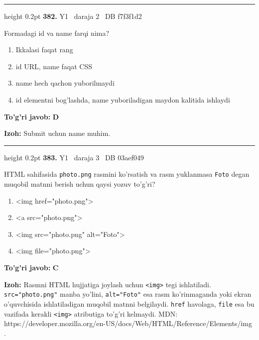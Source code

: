 \documentclass[10pt,a4paper,oneside]{article}
\begin{document}
\vspace{2mm}\hrule height 0.2pt \vspace{4mm}
\hypertarget{q382}{\textbf{\color{ink}382.}}  {\color{muted}\scriptsize Y1 \textbullet\ daraja 2 \textbullet\ DB f7f3f1d2}
\par
Formadagi id va name farqi nima?
\begin{enumerate}[label=\Alph*),leftmargin=9mm]
\item Ikkalasi faqat rang
\item id URL, name faqat CSS
\item name hech qachon yuborilmaydi
\item id elementni bog'lashda, name yuboriladigan maydon kalitida ishlaydi
\end{enumerate}
\begin{tcolorbox}[enhanced,breakable,colback=teal!4,colframe=teal!45!black,boxrule=0.45pt,arc=1.2mm,left=2.8mm,right=2.8mm,top=2mm,bottom=2mm,before skip=2mm,after skip=2mm]
\textbf{\color{teal}To'g'ri javob:} \textbf{D}
\par\smallskip
\textbf{Izoh:} Submit uchun name muhim.
\end{tcolorbox}
\vspace{2mm}\hrule height 0.2pt \vspace{4mm}
\hypertarget{q383}{\textbf{\color{ink}383.}}  {\color{muted}\scriptsize Y1 \textbullet\ daraja 3 \textbullet\ DB 03aef049}
\par
HTML sahifasida \texttt{photo.png} rasmini ko'rsatish va rasm yuklanmasa \texttt{Foto} degan muqobil matnni berish uchun qaysi yozuv to'g'ri?
\begin{enumerate}[label=\Alph*),leftmargin=9mm]
\item \textless{}img href="photo.png"\textgreater{}
\item \textless{}a src="photo.png"\textgreater{}
\item \textless{}img src="photo.png" alt="Foto"\textgreater{}
\item \textless{}img file="photo.png"\textgreater{}
\end{enumerate}
\begin{tcolorbox}[enhanced,breakable,colback=teal!4,colframe=teal!45!black,boxrule=0.45pt,arc=1.2mm,left=2.8mm,right=2.8mm,top=2mm,bottom=2mm,before skip=2mm,after skip=2mm]
\textbf{\color{teal}To'g'ri javob:} \textbf{C}
\par\smallskip
\textbf{Izoh:} Rasmni HTML hujjatiga joylash uchun \texttt{\textless{}img\textgreater{}} tegi ishlatiladi. \texttt{src="photo.png"} manba yo'lini, \texttt{alt="Foto"} esa rasm ko'rinmaganda yoki ekran o'quvchisida ishlatiladigan muqobil matnni belgilaydi. \texttt{href} havolaga, \texttt{file} esa bu vazifada kerakli \texttt{\textless{}img\textgreater{}} atributiga to'g'ri kelmaydi. MDN: https://developer.mozilla.org/en-US/docs/Web/HTML/Reference/Elements/img .
\end{tcolorbox}
\end{document}
